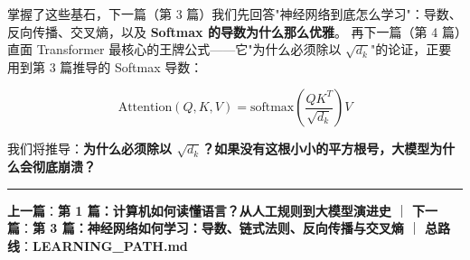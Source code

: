 掌握了这些基石，下一篇（第 3 篇）我们先回答"神经网络到底怎么学习"：导数、反向传播、交叉熵，以及 \textbf{Softmax 的导数为什么那么优雅}。
再下一篇（第 4 篇）直面 Transformer 最核心的王牌公式——它"为什么必须除以 $\sqrt{d_k}$"的论证，正要用到第 3 篇推导的 Softmax 导数：

\[
\text{Attention}(Q, K, V) = \text{softmax}\left(\frac{Q K^T}{\sqrt{d_k}}\right) V
\]

我们将推导：\textbf{为什么必须除以 $\sqrt{d_k}$？如果没有这根小小的平方根号，大模型为什么会彻底崩溃？}

\vspace{0.8em}\hrule\vspace{0.8em}

\textbf{上一篇}：\textbf{第 1 篇：计算机如何读懂语言？从人工规则到大模型演进史} ｜ \textbf{下一篇}：\textbf{第 3 篇：神经网络如何学习：导数、链式法则、反向传播与交叉熵} ｜ \textbf{总路线}：\textbf{LEARNING\_PATH.md}

